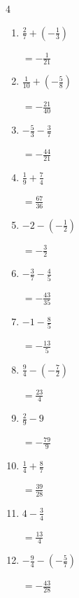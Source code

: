 \begin{multicols}{4}
\begin{enumerate}
  \item $\displaystyle \frac{2}{7} + \left(-\frac{1}{3}\right)$

        $\displaystyle =-\frac{1}{21}$

  \item $\displaystyle \frac{1}{10} + \left(-\frac{5}{8}\right)$

        $\displaystyle =-\frac{21}{40}$

\columnbreak %

  \item $\displaystyle -\frac{5}{3} - \frac{3}{7}$

        $\displaystyle =-\frac{44}{21}$

  \item $\displaystyle \frac{1}{9} + \frac{7}{4}$

        $\displaystyle =\frac{67}{36}$

  \item $\displaystyle -2 - \left(-\frac{1}{2}\right)$

        $\displaystyle =-\frac{3}{2}$

  \item $\displaystyle -\frac{3}{7} - \frac{4}{5}$

        $\displaystyle =-\frac{43}{35}$

  \item $\displaystyle -1 - \frac{8}{5}$

        $\displaystyle =-\frac{13}{5}$

  \item $\displaystyle \frac{9}{4} - \left(-\frac{7}{2}\right)$

        $\displaystyle =\frac{23}{4}$

  \item $\displaystyle \frac{2}{9} - 9$

        $\displaystyle =-\frac{79}{9}$

  \item $\displaystyle \frac{1}{4} + \frac{8}{7}$

        $\displaystyle =\frac{39}{28}$

  \item $\displaystyle 4 - \frac{3}{4}$

        $\displaystyle =\frac{13}{4}$

  \item $\displaystyle -\frac{9}{4} - \left(-\frac{5}{7}\right)$

        $\displaystyle =-\frac{43}{28}$


\end{enumerate}
\end{multicols}
